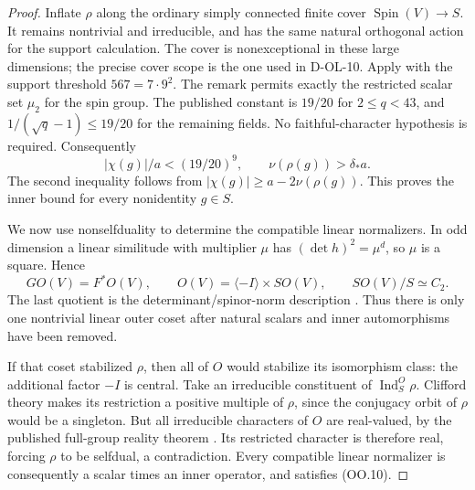 \begin{proof}
Inflate $\rho$ along the ordinary simply connected finite cover
$\operatorname{Spin}(V)\longrightarrow S$.  It remains nontrivial
and irreducible, and has the same natural orthogonal action for
the support calculation.  The cover is nonexceptional in these
large dimensions; the precise cover scope is the one used in
D-OL-10.  Apply
\cite[Theorem~4.3.6, equation~(4.3.2), pp.~1917--1918;
complete proof pp.~1918--1923; Remark~4.3.7, p.~1923]{HOS:LST2011}
with the support threshold $567=7\cdot9^2$.
The remark permits exactly the restricted scalar set $\mu_2$
for the spin group.  The published constant is $19/20$ for
$2\le q<43$, and $1/(\sqrt q-1)\le19/20$ for the remaining
fields.  No faithful-character hypothesis is required.
Consequently
\[
             |\chi(g)|/a<(19/20)^9,
             \qquad \nu(\rho(g))>\delta_*a.                 \tag{OO.10}
\]
The second inequality follows from
$|\chi(g)|\ge a-2\nu(\rho(g))$.  This proves the inner
bound for every nonidentity $g\in S$.

We now use nonselfduality to determine the compatible linear
normalizers.  In odd dimension a linear similitude with multiplier
$\mu$ has $(\det h)^2=\mu^d$, so $\mu$ is a square.  Hence
\[
 GO(V)=F^*O(V),\qquad O(V)=\langle-I\rangle\times SO(V),
                    \qquad SO(V)/S\simeq C_2.               \tag{OO.11}
\]
The last quotient is the determinant/spinor-norm description
\cite[Section~2, pp.~41--43]{OL:KTV2023}.  Thus there is only
one nontrivial linear outer coset after natural scalars and
inner automorphisms have been removed.

If that coset stabilized $\rho$, then all of $O$ would stabilize
its isomorphism class: the additional factor $-I$ is central.
Take an irreducible constituent of $\operatorname{Ind}_S^O\rho$.
Clifford theory makes its restriction a positive multiple of
$\rho$, since the conjugacy orbit of $\rho$ would be a singleton.
But all irreducible characters of $O$ are real-valued, by the
published full-group reality theorem
\cite[Theorem~1, p.~44; attribution and exact domain
pp.~39--40]{OL:KTV2023}.  Its restricted character is therefore
real, forcing $\rho$ to be selfdual, a contradiction.
Every compatible linear normalizer is consequently a scalar
times an inner operator, and satisfies (OO.10).


\end{proof}
